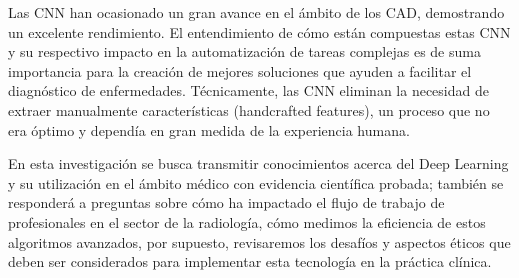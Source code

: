 Las CNN han ocasionado un gran avance en el ámbito de los CAD, demostrando un excelente rendimiento. El entendimiento de cómo están compuestas estas CNN y su respectivo impacto en la automatización de tareas complejas es de suma importancia para la creación de mejores soluciones que ayuden a facilitar el diagnóstico de enfermedades. Técnicamente, las CNN eliminan la necesidad de extraer manualmente características (handcrafted features), un proceso que no era óptimo y dependía en gran medida de la experiencia humana.



En esta investigación se busca transmitir conocimientos acerca del Deep Learning y su utilización en el ámbito médico con evidencia científica probada; también se responderá a preguntas sobre cómo ha impactado el flujo de trabajo de profesionales en el sector de la radiología, cómo medimos la eficiencia de estos algoritmos avanzados, por supuesto, revisaremos los desafíos y aspectos éticos que deben ser considerados para implementar esta tecnología en la práctica clínica.
